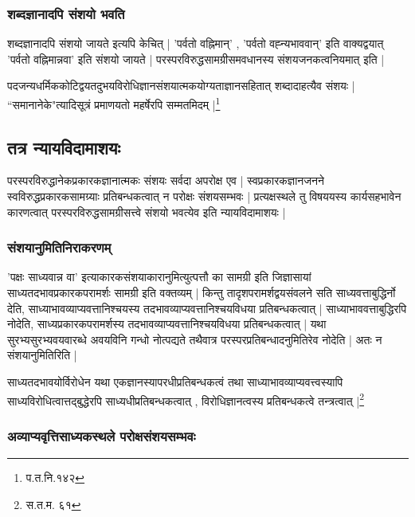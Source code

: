 \subsubsection{शब्दज्ञानादपि संशयो भवति}

शब्दज्ञानादपि संशयो जायते इत्यपि केचित् | 'पर्वतो वह्निमान्' , 'पर्वतो वह्न्यभाववान्' इति वाक्यद्वयात् 'पर्वतो वह्निमान्नवा' इति संशयो जायते | परस्परविरुद्धसामग्रीसमवधानस्य संशयजनकत्वनियमात् इति | 

{\fontsize{11.7}{0}\selectfont\s पदजन्यधर्मिककोटिद्वयतदुभयविरोधिज्ञानसंशयात्मकयोग्यताज्ञानसहितात् शब्दादाहत्यैव संशयः | “समानानेके"त्यादिसूत्रं प्रमाणयतो महर्षेरपि सम्मतमिदम् |\footnote{प.त.नि.१४२}}

\subsection{तत्र न्यायविदामाशयः}

परस्परविरुद्धानेकप्रकारकज्ञानात्मकः संशयः सर्वदा अपरोक्ष एव | स्वप्रकारकज्ञानजनने स्वविरुद्धप्रकारकसामग्र्याः प्रतिबन्धकत्वात् न परोक्षः संशयसम्भवः | प्रत्यक्षस्थले तु विषययस्य कार्यसहभावेन कारणत्वात् परस्परविरुद्धसामग्रीसत्त्वे संशयो भवत्येव इति न्यायविदामाशयः |

\subsubsection{संशयानुमितिनिराकरणम्}

'पक्षः साध्यवान्न वा' इत्याकारकसंशयाकारानुमित्युत्पत्तौ का सामग्री इति जिज्ञासायां साध्यतदभावप्रकारकपरामर्शः सामग्री इति वक्तव्यम् | किन्तु तादृशपरामर्शद्वयसंवलने सति साध्यवत्ताबुद्धिर्नो देति, साध्याभावव्याप्यवत्तानिश्चयस्य तदभावव्याप्यवत्तानिश्चयविधया प्रतिबन्धकत्वात् | साध्याभाववत्ताबुद्धिरपि नोदेति, साध्यप्रकारकपरामर्शस्य तदभावव्याप्यवत्तानिश्चयविधया प्रतिबन्धकत्वात् | यथा सुरभ्यसुरभ्यवयवारब्धे अवयविनि गन्धो नोत्पद्यते तथैवात्र परस्परप्रतिबन्धादनुमितिरेव नोदेति | अतः न संशयानुमितिरिति |

{\fontsize{11.7}{0}\selectfont\s साध्यतदभावयोर्विरोधेन यथा एकज्ञानस्यापरधीप्रतिबन्धकत्वं तथा साध्याभावव्याप्यवत्त्वस्यापि साध्यविरोधित्वात्तद्बुद्धेरपि साध्यधीप्रतिबन्धकत्वात् , विरोधिज्ञानत्वस्य प्रतिबन्धकत्वे तन्त्रत्वात् |\footnote{स.त.म. ६१}}

\subsubsection{अव्याप्यवृत्तिसाध्यकस्थले परोक्षसंशयसम्भवः}

